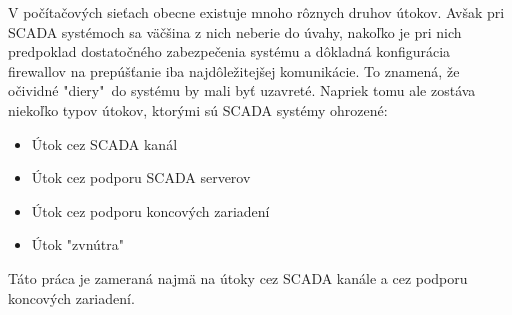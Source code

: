 V počítačových sieťach obecne existuje mnoho rôznych druhov útokov. Avšak pri SCADA systémoch sa väčšina z nich neberie do úvahy, nakoľko je pri nich predpoklad dostatočného zabezpečenia systému a dôkladná konfigurácia firewallov na prepúšťanie iba najdôležitejšej komunikácie. To znamená, že očividné "diery"\ do systému by mali byť uzavreté. Napriek tomu ale zostáva niekoľko typov útokov, ktorými sú SCADA systémy ohrozené\cite{Security}:
\begin{itemize}
\item Útok cez SCADA kanál
\item Útok cez podporu SCADA serverov
\item Útok cez podporu koncových zariadení
\item Útok "zvnútra"
\end{itemize}
Táto práca je zameraná najmä na útoky cez SCADA kanále a cez podporu koncových zariadení.

